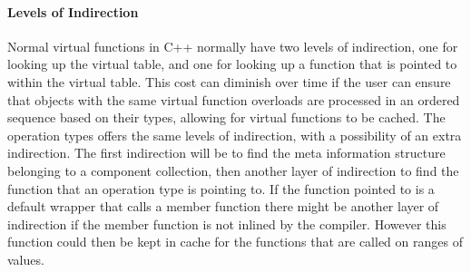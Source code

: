 \paragraph{Levels of Indirection}
Normal virtual functions in C++ normally have two levels of indirection, one for looking up the virtual table,
and one for looking up a function that is pointed to within the virtual table.
This cost can diminish over time if the user can ensure that objects with the same virtual function overloads
are processed in an ordered sequence based on their types, allowing for virtual functions to be cached.
The operation types offers the same levels of indirection, with a possibility of an extra indirection.
The first indirection will be to find the meta information structure belonging to a component collection,
then another layer of indirection to find the function that an operation type is pointing to.
If the function pointed to is a default wrapper that calls a member function there might be another layer of indirection
if the member function is not inlined by the compiler.
However this function could then be kept in cache for the functions that are called on ranges of values.
